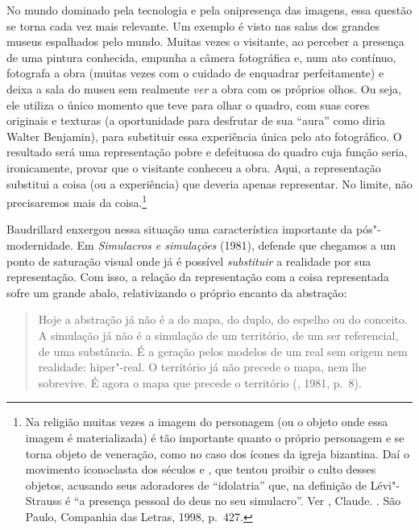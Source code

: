 No mundo dominado pela tecnologia e pela onipresença das imagens, essa
questão se torna cada vez mais relevante. Um exemplo é visto nas salas
dos grandes museus espalhados pelo mundo. Muitas vezes o visitante, ao
perceber a presença de uma pintura conhecida, empunha a câmera
fotográfica e, num ato contínuo, fotografa a obra (muitas vezes com o
cuidado de enquadrar perfeitamente) e deixa a sala do museu sem
realmente \emph{ver} a obra com os próprios olhos. Ou seja, ele utiliza
o único momento que teve para olhar o quadro, com suas cores originais e
texturas (a oportunidade para desfrutar de sua ``aura'' como diria
Walter Benjamin), para substituir essa experiência única pelo ato
fotográfico. O resultado será uma representação pobre e defeituosa do
quadro cuja função seria, ironicamente, provar que o visitante conheceu
a obra. Aqui, a representação substitui a coisa (ou a experiência) que
deveria apenas representar. No limite, não precisaremos mais da
coisa.\footnote{Na religião muitas vezes a imagem do personagem (ou o
  objeto onde essa imagem é materializada) é tão importante quanto o
  próprio personagem e se torna objeto de veneração, como no caso dos
  ícones da igreja bizantina. Daí o movimento iconoclasta dos séculos
   e , que tentou proibir o culto desses objetos, acusando seus
  adoradores de ``idolatria'' que, na definição de Lévi"-Strauss é ``a
  presença pessoal do deus no seu simulacro''. Ver , Claude.
  {}. São Paulo, Companhia das Letras, 1998, p.~427.}

Baudrillard enxergou nessa situação \label{saturacao}
uma característica importante da pós"-modernidade. Em \emph{Simulacros e
simulações} (1981), defende que chegamos a um ponto de saturação visual
onde já é possível \emph{substituir} a realidade por sua representação. Com
isso, a relação da representação com a coisa representada sofre um
grande abalo, relativizando o próprio encanto da abstração:

\begin{quote}
Hoje a abstração já não é a do mapa, do duplo, do espelho ou do
conceito. A simulação já não é a simulação de um território, de um ser
referencial, de uma substância. É a geração pelos modelos de um real sem
origem nem realidade: hiper"-real. O território já não precede o mapa,
nem lhe sobrevive. É agora o mapa que precede o território (,
1981, p.~8).
\end{quote}

